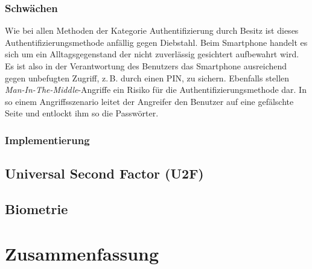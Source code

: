 \documentclass[11pt,a4paper,ngerman]{scrreprt}
\begin{document}
\subsection{Schwächen}
Wie bei allen Methoden der Kategorie Authentifizierung durch Besitz ist dieses Authentifizierungsmethode anfällig gegen Diebstahl. Beim Smartphone handelt es sich um ein Alltagsgegenstand der nicht zuverlässig gesichtert aufbewahrt wird. Es ist also in der Verantwortung des Benutzers das Smartphone ausreichend gegen unbefugten Zugriff, z.\,B. durch einen PIN, zu sichern. Ebenfalls stellen \textit{Man-In-The-Middle}-Angriffe ein Risiko für die Authentifizierungsmethode dar. In so einem Angriffsszenario leitet der Angreifer den Benutzer auf eine gefälschte Seite und entlockt ihm so die Passwörter.

\subsection{Implementierung}
\section{Universal Second Factor (U2F)}
\section{Biometrie}

\chapter{Zusammenfassung}


\end{document}
